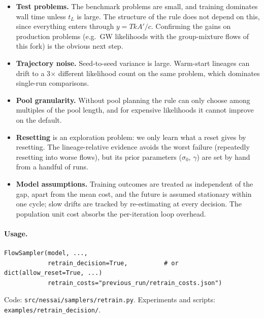 \documentclass[11pt,a4paper]{article}
\newcommand{\code}[1]{\texttt{#1}}
\begin{document}
\begin{itemize}
  \item \textbf{Test problems.} The benchmark problems are small, and
        training dominates wall time unless $t_L$ is large. The structure of
        the rule does not depend on this, since everything enters through
        $y=TkA'/c$. Confirming the gains on production problems (e.g.\ GW
        likelihoods with the group-mixture flows of this fork) is the obvious
        next step.
  \item \textbf{Trajectory noise.} Seed-to-seed variance is large. Warm-start
        lineages can drift to a 3$\times$ different likelihood count on the
        same problem, which dominates single-run comparisons.
  \item \textbf{Pool granularity.} Without pool planning the rule can only
        choose among multiples of the pool length, and for expensive
        likelihoods it cannot improve on the default.
  \item \textbf{Resetting} is an exploration problem: we only learn what a
        reset gives by resetting. The lineage-relative evidence avoids the
        worst failure (repeatedly resetting into worse flows), but its prior
        parameters ($\sigma_0$, $\gamma$) are set by hand from a handful of
        runs.
  \item \textbf{Model assumptions.} Training outcomes are treated as
        independent of the gap, apart from the mean cost, and the future is
        assumed stationary within one cycle; slow drifts are tracked by
        re-estimating at every decision. The population unit cost absorbs the
        per-iteration loop overhead.
\end{itemize}

\paragraph{Usage.}
\begin{verbatim}
FlowSampler(model, ...,
            retrain_decision=True,          # or dict(allow_reset=True, ...)
            retrain_costs="previous_run/retrain_costs.json")
\end{verbatim}
Code: \code{src/nessai/samplers/retrain.py}. Experiments and scripts:
\code{examples/retrain\_decision/}.
\end{document}
